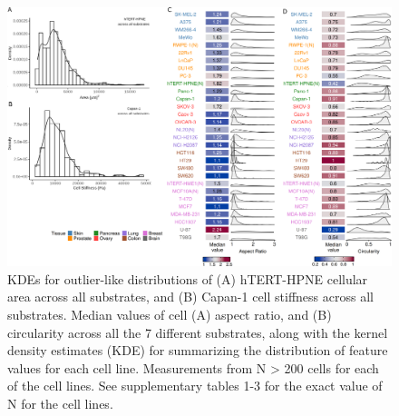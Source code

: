 \documentclass[11pt,letterpaper,english,oneside]{article} %
\begin{document}

\begin{figure}[H]
    \hspace*{-1.5cm}
    \centering
    \includegraphics[scale=0.14]{../Figures/Supplementary_Figure4/supplementary_figure4.png}
    \caption{KDEs for outlier-like distributions of (A) hTERT-HPNE cellular area across all substrates, and (B) Capan-1 cell stiffness across all substrates.
    Median values of cell (A) aspect ratio, and (B) circularity across all the 7 different substrates, along with the kernel density estimates (KDE) for summarizing the distribution of feature values for each cell line. Measurements from N > 200 cells for each of the cell lines. See supplementary tables 1-3 for the exact value of N for the cell lines.}
    \label{fig:fig4}
\end{figure}
\end{document}
